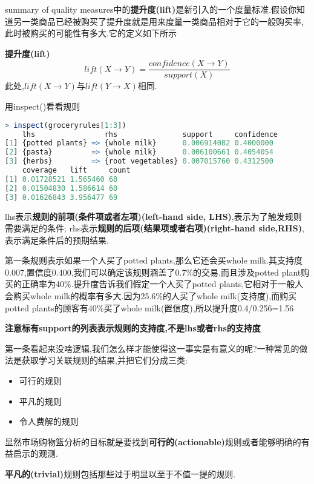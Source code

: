 \documentclass[11pt,a4paper,oneside]{book}
\begin{document}
summary of quality measures中的\textbf{提升度(lift)}是新引入的一个度量标准.假设你知道另一类商品已经被购买了提升度就是用来度量一类商品相对于它的一般购买率,此时被购买的可能性有多大.它的定义如下所示
\begin{tcolorbox}[colback=blue!7!white,colframe=blue!40]
\textbf{提升度(lift)}
\begin{equation}
lift(X\rightarrow Y)=\frac{confidence(X\rightarrow Y)}{support(X)}
\end{equation}
此处,$ lift(X\rightarrow Y) $与$ lift(Y\rightarrow X) $相同.
\end{tcolorbox}

用inspect()看看规则
\begin{lstlisting}[language=r]
> inspect(groceryrules[1:3])
    lhs                rhs               support     confidence
[1] {potted plants} => {whole milk}      0.006914082 0.4000000 
[2] {pasta}         => {whole milk}      0.006100661 0.4054054 
[3] {herbs}         => {root vegetables} 0.007015760 0.4312500 
    coverage   lift     count
[1] 0.01728521 1.565460 68   
[2] 0.01504830 1.586614 60   
[3] 0.01626843 3.956477 69   
\end{lstlisting}

lhs表示\textbf{规则的前项(条件项或者左项)(left-hand side, LHS)},表示为了触发规则需要满足的条件; rhs表示\textbf{规则的后项(结果项或者右项)(right-hand side,RHS)},表示满足条件后的预期结果.

第一条规则表示如果一个人买了potted plants,那么它还会买whole milk.其支持度0.007,置信度0.400,我们可以确定该规则涵盖了0.7\%的交易,而且涉及potted plant购买的正确率为40\%.提升度告诉我们假定一个人买了potted plants,它相对于一般人会购买whole milk的概率有多大.因为25.6\%的人买了whole milk(支持度),而购买potted plants的顾客有40\%买了whole milk(置信度),所以提升度0.4/0.256=1.56

\textbf{注意标有support的列表表示规则的支持度,不是lhs或者rhs的支持度}

第一条看起来没啥逻辑,我们怎么样才能使得这一事实是有意义的呢?一种常见的做法是获取学习关联规则的结果,并把它们分成三类:

\begin{itemize}
	\item 可行的规则
	\item 平凡的规则
	\item 令人费解的规则
\end{itemize}
显然市场购物篮分析的目标就是要找到\textbf{可行的(actionable)}规则或者能够明确的有益启示的观测.

\textbf{平凡的(trivial)}规则包括那些过于明显以至于不值一提的规则.
\end{document}
